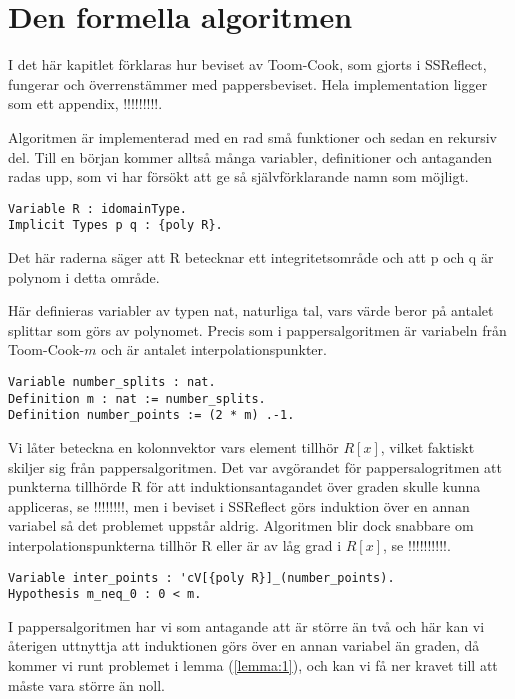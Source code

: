 \section{Den formella algoritmen}
I det här kapitlet förklaras hur beviset av Toom-Cook, som gjorts i SSReflect,
fungerar och överrenstämmer med pappersbeviset. Hela implementation ligger som
ett appendix, !!!!!!!!!.

Algoritmen är implementerad med en rad små funktioner och sedan en rekursiv
del. Till en början kommer alltså många variabler, definitioner och antaganden
radas upp, som vi har försökt att ge så självförklarande namn som möjligt.

\begin{lstlisting}
Variable R : idomainType.
Implicit Types p q : {poly R}.
\end{lstlisting}

Det här raderna säger att R betecknar ett integritetsområde och att p och q är
polynom i detta område.

Här definieras variabler av typen nat, naturliga tal, vars värde beror på
antalet splittar som görs av polynomet. Precis som i pappersalgoritmen är 
variabeln från Toom-Cook-$m$ och  är antalet
interpolationspunkter.

\begin{lstlisting}
Variable number_splits : nat.
Definition m : nat := number_splits.
Definition number_points := (2 * m) .-1.
\end{lstlisting}

Vi låter  beteckna en kolonnvektor vars element tillhör $R[x]$,
vilket faktiskt skiljer sig från pappersalgoritmen. Det var avgörandet för
pappersalogritmen att punkterna tillhörde R för att induktionsantagandet över
graden skulle kunna appliceras, se !!!!!!!!, men i beviset i SSReflect görs
induktion över en annan variabel så det problemet uppstår aldrig. Algoritmen
blir dock snabbare om interpolationspunkterna tillhör R eller är av låg grad i
$R[x]$, se !!!!!!!!!!.

\begin{lstlisting}
Variable inter_points : 'cV[{poly R}]_(number_points).
Hypothesis m_neq_0 : 0 < m.
\end{lstlisting}

I pappersalgoritmen har vi som antagande att  är större än två och här kan
vi återigen uttnyttja att induktionen görs över en annan variabel än graden, då
kommer vi runt problemet i lemma (\ref{lemma:1}), och kan vi få ner kravet till
att  måste vara större än noll.

